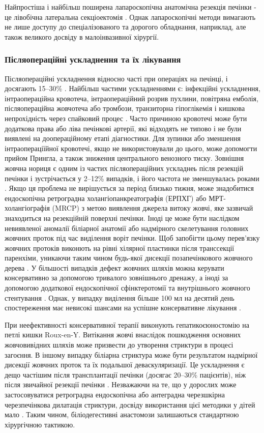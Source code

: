 Найпростіша і найбільш поширена лапароскопічна анатомічна резекція печінки - це лівобічна латеральна секціоектомія \cite{pmid9149752}. Однак лапароскопічні методи вимагають не лише доступу до спеціалізованого та дорогого обладнання, наприклад, але також великого досвіду в малоінвазивної хірургії.

\subsubsection{Післяопераційні ускладнення та їх лікування}
Післяопераційні ускладнення відносно часті при операціях на печінці, і досягають 15–30\% \cite{pmid9149752}. Найбільш частими ускладненнями є: інфекційні ускладнення, інтраопераційна кровотеча, інтраопераційний розрив пухлини, повітряна емболія, післяопераційна жовчотеча або тромбози, транзиторна гіпоглікемія і кишкова непрохідність через спайковий процес \cite{pmid9494762}.
 Часто причиною кровотечі може бути додаткова права або ліва печінкові артерії, які відходять не типово і не були виявлені на доопераційному етапі діагностики. Для зупинки або зменшення інтраопераціїйної кровотечі, якщо не використовували до цього, може допомогти прийом Прингла, а також зниження центрального венозного тиску.
Зовнішня жовчна нориця є одним із частих післяопераційних ускладнеь після резекцій печінки і зустрічається у 2–12\% випадків, і його частота не зменшувалась роками \cite{pmid29888545}. Якщо ця проблема не вирішується за період близько тижня, може знадобитися ендоскопічна ретроградна холангіопанкреатографія (ЕРПХГ) або МРТ-холангіографія (MRCP) з метою виявлення джерела витоку жовчі, яке зазвичай знаходиться на резекційній поверхні печінки. Іноді це може бути наслідком невиявленої аномалії біліарної анатомії або надмірного скелетування головних жовчних проток під час виділення воріт печінки. Щоб запобігти цьому перев'язку жовчних протоків виконють на рівні хілярної пластинки після транссекції паренхіми, уникаючи таким чином будь-якої дисекції позапечінкового жовчного дерева \cite{pmid24759227}. У більшості випадків дефект жовчних шляхів можна керувати консервативно за допомогою тривалого зовнішнього дренажу, а іноді за допомогою додаткової ендоскопічної сфінктеротомії та внутрішнього жовчного стентування \cite{pmid16404555}. Однак, у випадку виділення більше 100 мл на десятий день спостереження має невисокі шансами на успішне консервативне лікування \cite{pmid15285242}. 

При неефективності консервативної терапії виконують гепатикоєюностомію на петлі кишки Roux-en-Y. Витікання жовчі внаслідок пошкодження основних жовчовивідних шляхів може призвести до утворення стриктури в процесі загоєння. В іншому випадку біліарна стриктура може бути результатом надмірної дисекції жовчних проток та їх подальшої деваскуляризації. Це ускладнення є дещо частішим після трансплантації печінки (досягає 20–30\% пацієнтів), ніж після звичайної резекції печінки \cite{pmid16123986}. Незважаючи на те, що у дорослих може застосовуватися ретроградна ендоскопічна або антеградна черезшкірна черезпечінкова дилатація стриктури, досвіду використання цієї методики у дітей мало \cite{pmid12115331}. Таким чином, біліодегестивні анастомози залишаються стандартною хірургічною тактикою.

